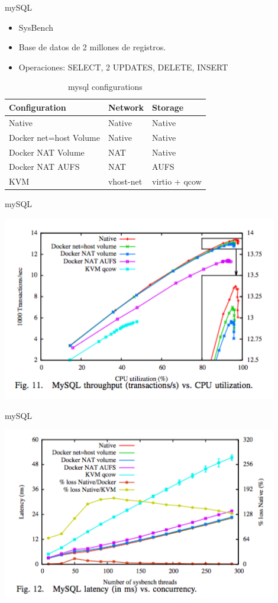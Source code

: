 \documentclass[compress]{beamer}
\begin{document}
\begin{frame}{mySQL}
\begin{itemize}
	\item SysBench
	\item Base de datos de 2 millones de registros.
	\item Operaciones: SELECT, 2 UPDATES, DELETE, INSERT
\end{itemize}

\begin{table}[h]
\centering
\begin{tabular}{|l|l|l|}
\hline
Configuration & Network & Storage \\ \hline
Native & Native & Native \\ \hline
Docker net=host Volume & Native & Native \\ \hline
Docker NAT Volume & NAT & Native \\ \hline
Docker NAT AUFS & NAT & AUFS \\ \hline
KVM & vhost-net & virtio + qcow \\ \hline
\end{tabular}
\caption{mysql configurations}
\label{my-label}
\end{table}


\end{frame}

\begin{frame}{mySQL}

  \includegraphics[width=0.9\textwidth]{images/mysql1}
\end{frame}
\begin{frame}{mySQL}

  \includegraphics[width=0.9\textwidth]{images/mysql2}
\end{frame}
\end{document}
